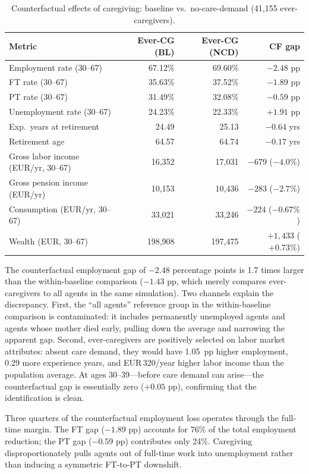 \begin{table}[htbp]
  \centering
  \caption{Counterfactual effects of caregiving: baseline vs.\ no-care-demand (41,155 ever-caregivers).}
  \label{tab:counterfactual_effects_ncd}
  \small
  \begin{tabular}{lrrr}
    \toprule
    Metric & Ever-CG (BL) & Ever-CG (NCD) & CF gap \\
    \midrule
    Employment rate (30--67) & 67.12\% & 69.60\% & $-2.48$ pp \\
    \quad FT rate (30--67) & 35.63\% & 37.52\% & $-1.89$ pp \\
    \quad PT rate (30--67) & 31.49\% & 32.08\% & $-0.59$ pp \\
    \quad Unemployment rate (30--67) & 24.23\% & 22.33\% & $+1.91$ pp \\
    \addlinespace
    Exp.\ years at retirement & 24.49 & 25.13 & $-0.64$ yrs \\
    Retirement age & 64.57 & 64.74 & $-0.17$ yrs \\
    \addlinespace
    Gross labor income (EUR/yr, 30--67) & 16,352 & 17,031 & $-679$ ($-4.0\%$) \\
    Gross pension income (EUR/yr) & 10,153 & 10,436 & $-283$ ($-2.7\%$) \\
    Consumption (EUR/yr, 30--67) & 33,021 & 33,246 & $-224$ ($-0.67\%$) \\
    Wealth (EUR, 30--67) & 198,908 & 197,475 & $+1{,}433$ ($+0.73\%$) \\
    \bottomrule
  \end{tabular}
\end{table}

The counterfactual employment gap of $-2.48$ percentage points is 1.7 times larger than the within-baseline comparison ($-1.43$ pp, which merely compares ever-caregivers to all agents in the same simulation). Two channels explain the discrepancy. First, the ``all agents'' reference group in the within-baseline comparison is contaminated: it includes permanently unemployed agents and agents whose mother died early, pulling down the average and narrowing the apparent gap. Second, ever-caregivers are positively selected on labor market attributes: absent care demand, they would have 1.05~pp higher employment, 0.29 more experience years, and EUR\,320/year higher labor income than the population average. At ages 30--39---before care demand can arise---the counterfactual gap is essentially zero ($+0.05$ pp), confirming that the identification is clean.

Three quarters of the counterfactual employment loss operates through the full-time margin. The FT gap ($-1.89$ pp) accounts for 76\% of the total employment reduction; the PT gap ($-0.59$ pp) contributes only 24\%. Caregiving disproportionately pulls agents out of full-time work into unemployment rather than inducing a symmetric FT-to-PT downshift.

